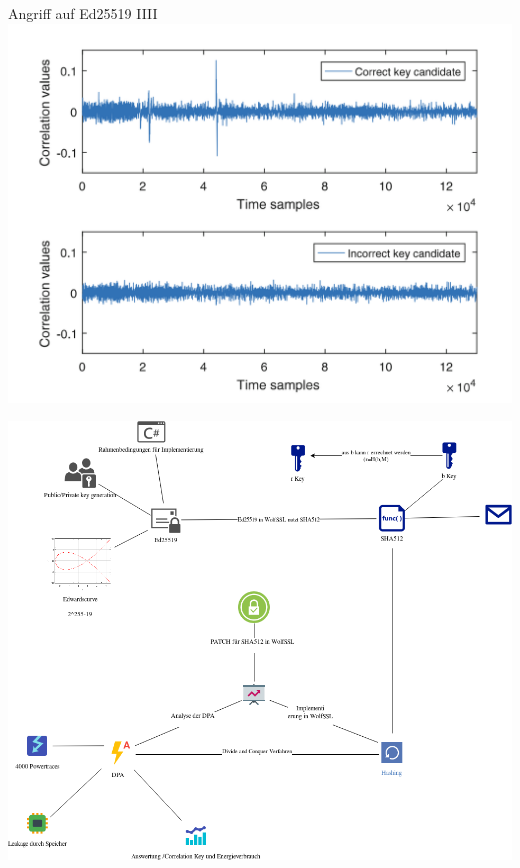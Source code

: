 \documentclass[
  10pt,
  ignorenonframetext,
  aspectratio=169,
]{beamer}
\begin{document}
\begin{frame}{Angriff auf Ed25519 IIII}
\protect\hypertarget{angriff-auf-ed25519-iiii}{}
\includegraphics{Abbildungen/cvDPA.png}
\end{frame}

\begin{frame}{}
\protect\hypertarget{section-23}{}
\includegraphics{Abbildungen/ITSEC(1).png}
\end{frame}
\end{document}
